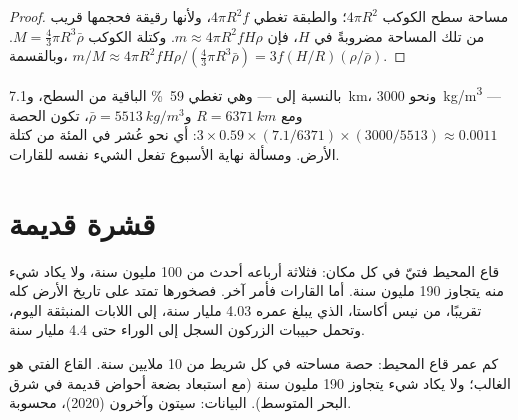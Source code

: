 \begin{proof}
مساحة سطح الكوكب $4\pi R^2$؛ والطبقة تغطي $4\pi R^2 f$،
ولأنها رقيقة فحجمها قريب من تلك المساحة مضروبةً في $H$، فإن $m \approx 4\pi R^2
f H \rho$. وكتلة الكوكب $M = \tfrac{4}{3}\pi R^3 \bar\rho$. وبالقسمة،
$m/M \approx 4\pi R^2 f H \rho / (\tfrac{4}{3}\pi R^3 \bar\rho) = 3 f (H/R)
(\rho/\bar\rho)$.
\end{proof}

بالنسبة إلى  --- وهي تغطي \qty{59}{\percent} الباقية من السطح،
و\qty{7.1}{km}، ونحو \qty{3000}{kg/m^3} --- ومع $R = \qty{6371}{km}$
و$\bar\rho = \qty{5513}{kg/m^3}$، تكون الحصة $3 \times 0.59 \times
(7.1/6371) \times (3000/5513) \approx 0.0011$: أي نحو عُشر في المئة من
كتلة الأرض. ومسألة نهاية الأسبوع تفعل الشيء نفسه للقارات.

\section{قشرة قديمة}

قاع المحيط فتيّ في كل مكان: فثلاثة أرباعه أحدث من
100 مليون سنة، ولا يكاد شيء منه يتجاوز 190 مليون سنة. أما
القارات فأمر آخر. فصخورها تمتد على تاريخ الأرض كله تقريبًا،
من نيس أكاستا، الذي يبلغ عمره 4.03 مليار سنة، إلى اللابات المنبثقة
اليوم، وتحمل حبيبات الزركون السجل إلى الوراء حتى 4.4 مليار سنة.

\begin{omfigure}

{\small كم عمر قاع المحيط: حصة مساحته في كل شريط من 10
ملايين سنة. القاع الفتي هو الغالب؛ ولا يكاد شيء يتجاوز 190
مليون سنة (مع استبعاد بضعة أحواض قديمة في شرق البحر المتوسط).
البيانات: سيتون وآخرون (2020)، محسوبة.}
\end{omfigure}

